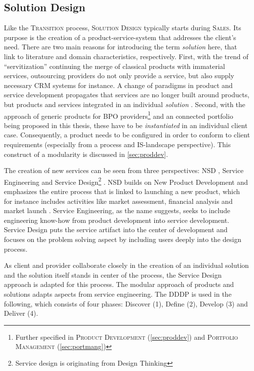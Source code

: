 	\subsection{Solution Design}
	\label{sec:soldef}
	Like the \textsc{Transition} process, \textsc{Solution Design} typically starts during \textsc{Sales}. Its purpose is the creation of a product-service-system that addresses the client's need. There are two main reasons for introducing the term \textit{solution} here, that link to literature and domain characteristics, respectively. First, with the trend of \enquote{servitization} \citep{servitization} continuing the merge of classical products with immaterial services, outsourcing providers do not only provide a service, but also supply necessary \acrshort{CRM} systems for instance. A change of paradigms in product and service development propagates that services are no longer built around products, but products and services integrated in an individual \textit{solution} \citep[]{Spath2006}.
	Second, with the approach of generic products for \acrshort{BPO} providers\footnote{Further specified in \textsc{Product Development} (\ref{sec:proddev}) and \textsc{Portfolio Management} (\ref{sec:portmang})} and an connected portfolio being proposed in this thesis, these have to be \textit{instantiated} in an individual client case. Consequently, a product needs to be configured in order to conform to client requirements (especially from a process and  \acrshort{IS}-landscape perspective). This construct of a modularity is discussed in \ref{sec:proddev}. 
	
	The creation of new services can be seen from three perspectives: \acrfull{NSD} \citep{cowell1988new}, Service Engineering \citep{9783540253242} and Service Design\footnote{Service design is originating from Design Thinking} \citep{rowe1987design}. \acrshort{NSD} builds on New Product Development and emphasizes the entire process that is linked to launching a new product, which for instance includes activities like market assessment, financial analysis and market launch \citep{cooper1988new}. Service Engineering, as the name suggests, seeks to include engineering know-how from product development into service development. Service Design puts the service artifact into the center of development and focuses on the problem solving aspect by including users deeply into the design process. 
	
	As client and provider collaborate closely in the creation of an individual solution and the solution itself stands in center of the process, the Service Design approach is adapted for this process. The modular approach of products and solutions adapts aspects from service engineering. The \acrfull{DDDP} \citep{dcdd} is used in the following, which consists of four phases: Discover (1), Define (2), Develop (3) and Deliver (4).
	
